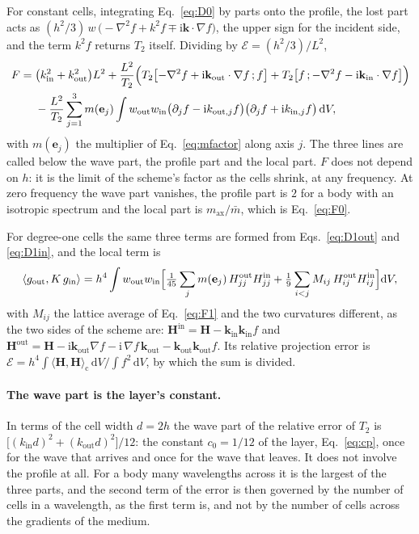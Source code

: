 \documentclass[11pt,a4paper]{article}
\newcommand{\bk}{\mathbf{k}}
\newcommand{\cE}{\mathcal{E}}
\newcommand{\dd}{\mathrm{d}}
\begin{document}
For constant cells, integrating Eq.~\eqref{eq:D0} by parts onto the profile, the lost part acts as
$(h^2/3)\,w\,\bigl(-\nabla^2f+k^2f\mp\mathrm{i}\bk\cdot\nabla f\bigr)$, the upper sign for the incident
side, and the term $k^2f$ returns $T_2$ itself. Dividing by $\cE=(h^2/3)/L^2$,
\begin{equation}\label{eq:Fdyn}
\begin{split}
  F={}&\bigl(k_{\mathrm{in}}^2+k_{\mathrm{out}}^2\bigr)L^2
     +\frac{L^2}{T_2}\Bigl(T_2\bigl[-\nabla^2f+\mathrm{i}\bk_{\mathrm{out}}\cdot\nabla f\,;f\bigr]
     +T_2\bigl[f\,;-\nabla^2f-\mathrm{i}\bk_{\mathrm{in}}\cdot\nabla f\bigr]\Bigr)\\
     &-\frac{L^2}{T_2}\sum_{j=1}^{3}m(\mathbf{e}_j)\int w_{\mathrm{out}}w_{\mathrm{in}}
     \bigl(\partial_jf-\mathrm{i}k_{\mathrm{out},j}f\bigr)\bigl(\partial_jf+\mathrm{i}k_{\mathrm{in},j}f\bigr)\,\dd V ,
\end{split}
\end{equation}
with $m(\mathbf{e}_j)$ the multiplier of Eq.~\eqref{eq:mfactor} along axis $j$. The three lines are
called below the wave part, the profile part and the local part. $F$ does not depend on $h$: it is the
limit of the scheme's factor as the cells shrink, at any frequency. At zero frequency the wave part
vanishes, the profile part is $2$ for a body with an isotropic spectrum and the local part is
$m_{\mathrm{ax}}/\bar m$, which is Eq.~\eqref{eq:F0}.

For degree-one cells the same three terms are formed from Eqs.~\eqref{eq:D1out} and \eqref{eq:D1in}, and
the local term is
\begin{equation}\label{eq:local1}
  \langle g_{\mathrm{out}},K\,g_{\mathrm{in}}\rangle=h^4\int w_{\mathrm{out}}w_{\mathrm{in}}
  \Bigl[\tfrac1{45}\sum_jm(\mathbf{e}_j)\,H^{\mathrm{out}}_{jj}H^{\mathrm{in}}_{jj}
  +\tfrac19\sum_{i<j}M_{ij}\,H^{\mathrm{out}}_{ij}H^{\mathrm{in}}_{ij}\Bigr]\dd V,
\end{equation}
with $M_{ij}$ the lattice average of Eq.~\eqref{eq:F1} and the two curvatures different, as the two sides
of the scheme are:
$\mathbf{H}^{\mathrm{in}}=\mathbf{H}-\bk_{\mathrm{in}}\bk_{\mathrm{in}}f$ and
$\mathbf{H}^{\mathrm{out}}=\mathbf{H}-\mathrm{i}\bk_{\mathrm{out}}\nabla f-\mathrm{i}\,\nabla f\,\bk_{\mathrm{out}}
-\bk_{\mathrm{out}}\bk_{\mathrm{out}}f$. Its relative projection error is
$\cE=h^4\int\langle\mathbf{H},\mathbf{H}\rangle_{\mathrm{c}}\,\dd V/\int f^2\,\dd V$, by which the sum is
divided.
\paragraph{The wave part is the layer's constant.} In terms of the cell width $d=2h$ the wave part of the
relative error of $T_2$ is $\bigl[(k_{\mathrm{in}}d)^2+(k_{\mathrm{out}}d)^2\bigr]/12$: the constant
$c_0=1/12$ of the layer, Eq.~\eqref{eq:cp}, once for the wave that arrives and once for the wave that
leaves. It does not involve the profile at all. For a body many wavelengths across it is the largest of
the three parts, and the second term of the error is then governed by the number of cells in a
wavelength, as the first term is, and not by the number of cells across the gradients of the medium.
\end{document}
